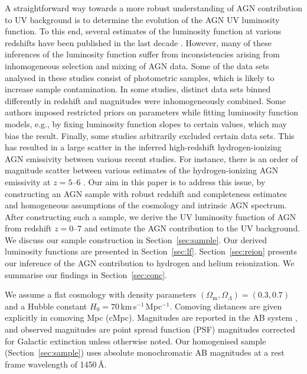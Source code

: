 \documentclass[fleqn,usenatbib]{mnras}
\begin{document}
A straightforward way towards a more robust understanding of AGN
contribution to UV background is to determine the evolution of the AGN
UV luminosity function.  To this end, several estimates of the
luminosity function at various redshifts have been published in the
last decade \citep{2009A&A...507..781S, 2011ApJ...728L..26G,
  2012ApJ...755..169M, 2013ApJ...773...14R, 2013ApJ...768..105M,
  2015AA...578A..83G, 2016ApJ...833..222J, 2016ApJ...829...33Y,
  2017ApJ...847L..15O, 2018PASJ...70S..34A}.  However, many of these
inferences of the luminosity function suffer from inconsistencies
arising from inhomogeneous selection and mixing of AGN data.  Some of
the data sets analysed in these studies consist of photometric
samples, which is likely to increase sample contamination.  In some
studies, distinct data sets binned differently in redshift and
magnitudes were inhomogeneously combined.  Some authors imposed
restricted priors on parameters while fitting luminosity function
models, e.g., by fixing luminosity function slopes to certain values,
which may bias the result.  Finally, some studies arbitrarily excluded
certain data sets.  This has resulted in a large scatter in the
inferred high-redshift hydrogen-ionizing AGN emissivity between
various recent studies.  For instance, there is an order of magnitude
scatter between various estimates of the hydrogen-ionizing AGN
emissivity at $z=5$--$6$ \citep{2011ApJ...728L..26G,
  2012ApJ...755..169M, 2015AA...578A..83G, 2018PASJ...70S..34A,
  2018AJ....155..131M, 2018MNRAS.474.2904P, 2017ApJ...847L..15O}.  Our
aim in this paper is to address this issue, by constructing an AGN
sample with robust redshift and completeness estimates and homogeneous
assumptions of the cosmology and intrinsic AGN spectrum.  After
constructing such a sample, we derive the UV luminosity function of
AGN from redshift $z=0$--$7$ and estimate the AGN contribution to the
UV background.  We discuss our sample construction in
Section~\ref{sec:sample}.  Our derived luminosity functions are
presented in Section~\ref{sec:lf}.  Section~\ref{sec:reion} presents
our inference of the AGN contribution to hydrogen and helium
reionization.  We summarise our findings in Section~\ref{sec:conc}.

We assume a flat cosmology with density parameters
$\left(\Omega_\mathrm{m},\Omega_\Lambda\right)=\left(0.3,0.7\right)$
and a Hubble constant $H_0=70$\,km\,s$^{-1}$\,Mpc$^{-1}$. Comoving
distances are given explicitly in comoving Mpc (cMpc). Magnitudes
are reported in the AB system \citep{1983ApJ...266..713O}, and
observed magnitudes are point spread function (PSF) magnitudes
\citep{2002AJ....123..485S} corrected for Galactic extinction
\citep{1998ApJ...500..525S} unless otherwise noted.
Our homogenised sample (Section~\ref{sec:sample}) uses absolute
monochromatic AB magnitudes at a rest frame wavelength of 1450\,\AA.
\end{document}

